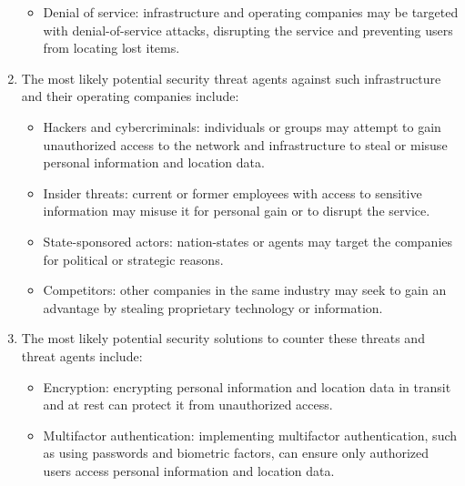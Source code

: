 \begin{enumerate}
\begin{itemize}
            \item Denial of service: infrastructure and operating companies may be targeted with denial-of-service attacks, disrupting the service and preventing users from locating lost items.
        \end{itemize}
    \item The most likely potential security threat agents against such infrastructure and their operating companies include:
        \begin{itemize}
            \item Hackers and cybercriminals: individuals or groups may attempt to gain unauthorized access to the network and infrastructure to steal or misuse personal information and location data.
            \item Insider threats: current or former employees with access to sensitive information may misuse it for personal gain or to disrupt the service.
            \item State-sponsored actors: nation-states or agents may target the companies for political or strategic reasons.
            \item Competitors: other companies in the same industry may seek to gain an advantage by stealing proprietary technology or information.
        \end{itemize}
    \item The most likely potential security solutions to counter these threats and threat agents include:
        \begin{itemize}
            \item Encryption: encrypting personal information and location data in transit and at rest can protect it from unauthorized access.
            \item Multifactor authentication: implementing multifactor authentication, such as using passwords and biometric factors, can ensure only authorized users access personal information and location data.
        \end{itemize}
\end{enumerate}